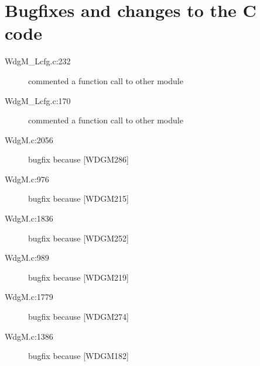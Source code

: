 \documentclass[11pt,a4paper]{article}
\begin{document}
\section{Bugfixes and changes to the C code}
\begin{description}
  \item[WdgM\_Lcfg.c:232] commented a function call to other module
  \item[WdgM\_Lcfg.c:170] commented a function call to other module
  \item[WdgM.c:2056] bugfix because [WDGM286]
  \item[WdgM.c:976] bugfix because [WDGM215]
  \item[WdgM.c:1836] bugfix because [WDGM252]
  \item[WdgM.c:989] bugfix because [WDGM219]
  \item[WdgM.c:1779] bugfix because [WDGM274]
  \item[WdgM.c:1386] bugfix because [WDGM182]
\end{description}
\end{document}
